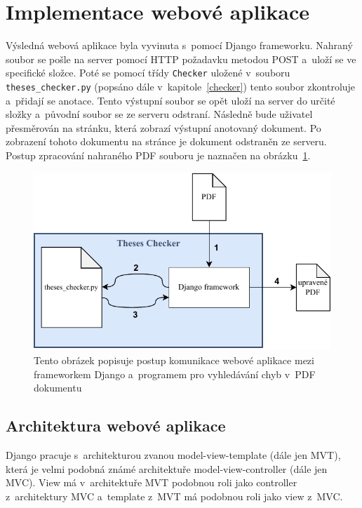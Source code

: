 \section{Implementace webové aplikace} \label{web_app}
Výsledná webová aplikace byla vyvinuta s~pomocí Django frameworku.
Nahraný soubor se pošle na server pomocí HTTP požadavku metodou POST
a~uloží se ve specifické složce. Poté se pomocí třídy \texttt{Checker}
uložené v~souboru \texttt{theses\_checker.py} (popsáno dále
v~kapitole~\ref{checker}) tento soubor zkontroluje a~přidají se anotace.
Tento výstupní soubor se opět uloží na server do určité složky a~původní soubor
se ze serveru odstraní. Následně bude uživatel přesměrován na stránku, která
zobrazí výstupní anotovaný dokument. Po zobrazení tohoto dokumentu na stránce je
dokument odstraněn ze serveru. Postup zpracování nahraného PDF souboru je
naznačen na obrázku~\ref{pic_communication}.

\begin{figure}[H]
    \centering
    \includegraphics[width=0.8\linewidth]{obrazky-figures/Theses_Checker_communication.pdf}
    \caption{
        Tento obrázek popisuje postup komunikace webové aplikace mezi 
        frameworkem Django a~programem pro vyhledávání chyb v~PDF dokumentu 
    }
    \label{pic_communication}
\end{figure}


\subsection*{Architektura webové aplikace}
Django pracuje s~architekturou zvanou model-view-template (dále jen MVT),
která je velmi podobná známé architektuře model-view-controller (dále jen MVC).
View má v~architektuře MVT podobnou roli jako controller z~architektury MVC 
a~template z~MVT má podobnou roli jako view z~MVC.

